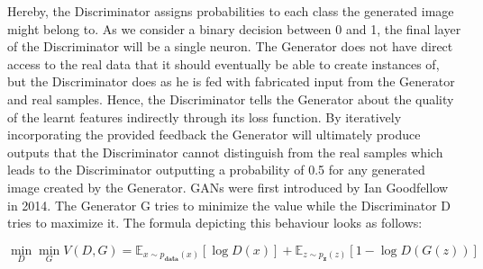 	Hereby, the Discriminator assigns probabilities to each class the generated image might belong to. As we consider a binary decision between 0 and 1, the final layer of the Discriminator will be a single neuron. The Generator does not have direct access to the real data that it should eventually be able to create instances of, but the Discriminator does as he is fed with fabricated input from the Generator and real samples. Hence, the Discriminator tells the Generator about the quality of the learnt features indirectly through its loss function. By iteratively incorporating the provided feedback the Generator will ultimately produce outputs that the Discriminator cannot distinguish from the real samples which leads to the Discriminator outputting a probability of 0.5 for any generated image created by the Generator.  
    GANs were first introduced by Ian Goodfellow \cite{goodfellow2014generative} in 2014. The Generator G tries to minimize the value while the Discriminator D tries to maximize it. The formula depicting this behaviour looks as follows: 

    \begin{equation}
        \min_{D} \min_{G} V(D,G) = \mathbb{E}_{x \sim p_\textbf{data}(x)}[\log D(x)] + \mathbb{E}_{z \sim p_\textbf{z}(z)}[1-\log D(G(z))]
    \end{equation}
    
